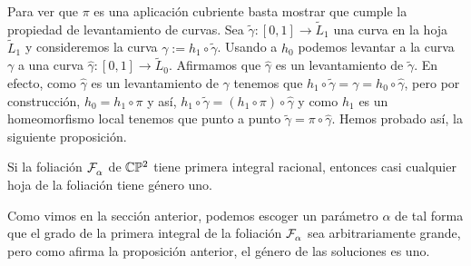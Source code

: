 Para ver que $\pi$ es una aplicación cubriente basta mostrar que cumple la propiedad de levantamiento de curvas. Sea $\tilde{\gamma}\colon [0,1]\rightarrow\tilde{L}_{1}$ una curva en la hoja $\tilde{L}_{1}$ y consideremos la curva $\gamma:=h_{1}\circ\tilde{\gamma}$. Usando a $h_{0}$ podemos levantar a la curva $\gamma$ a una curva $\hat{\gamma}\colon [0,1]\rightarrow\tilde{L}_{0}$. Afirmamos que $\hat{\gamma}$ es un levantamiento de $\tilde{\gamma}$. En efecto, como $\hat{\gamma}$ es un levantamiento de $\gamma$ tenemos que $h_{1}\circ\tilde{\gamma}=\gamma=h_{0}\circ\hat{\gamma}$, pero por construcción, $h_{0}=h_{1}\circ\pi$ y así, $h_{1}\circ\tilde{\gamma}=(h_{1}\circ\pi)\circ\hat{\gamma}$ y como $h_{1}$ es un homeomorfismo local tenemos que punto a punto $\tilde{\gamma}=\pi\circ\hat{\gamma}$. Hemos probado así, la siguiente proposición.

\begin{Proposicion}
\label{Prop:GeneroDeLasSoluciones}
Si la foliación $\mathcal{F}^{\ }_{\alpha}$ de $\mathbb{C}\mathbb{P}^2$ tiene primera integral racional, entonces casi cualquier hoja de la foliación tiene género uno.
\end{Proposicion}

Como vimos en la sección anterior, podemos escoger un parámetro $\alpha$ de tal forma que el grado de la primera integral de la foliación $\mathcal{F}^{\ }_{\alpha}$ sea arbitrariamente grande, pero como afirma la proposición anterior, el género de las soluciones es uno.
